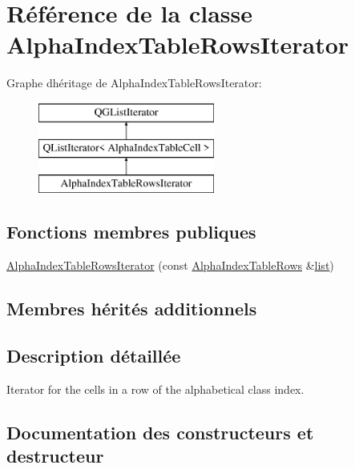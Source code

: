 \hypertarget{class_alpha_index_table_rows_iterator}{}\section{Référence de la classe Alpha\+Index\+Table\+Rows\+Iterator}
\label{class_alpha_index_table_rows_iterator}
Graphe d\textquotesingle{}héritage de Alpha\+Index\+Table\+Rows\+Iterator\+:\begin{figure}[H]
\begin{center}
\leavevmode
\includegraphics[height=3.000000cm]{class_alpha_index_table_rows_iterator}
\end{center}
\end{figure}
\subsection*{Fonctions membres publiques}
\begin{DoxyCompactItemize}
\item 
\hyperlink{class_alpha_index_table_rows_iterator_af4dfd3a88c6e9da47903727f9c6df44f}{Alpha\+Index\+Table\+Rows\+Iterator} (const \hyperlink{class_alpha_index_table_rows}{Alpha\+Index\+Table\+Rows} \&\hyperlink{class_q_g_list_iterator_a6e606950ab50b273e8370d9e24756bf2}{list})
\end{DoxyCompactItemize}
\subsection*{Membres hérités additionnels}


\subsection{Description détaillée}
Iterator for the cells in a row of the alphabetical class index. 

\subsection{Documentation des constructeurs et destructeur}
\hypertarget{class_alpha_index_table_rows_iterator_af4dfd3a88c6e9da47903727f9c6df44f}{}
